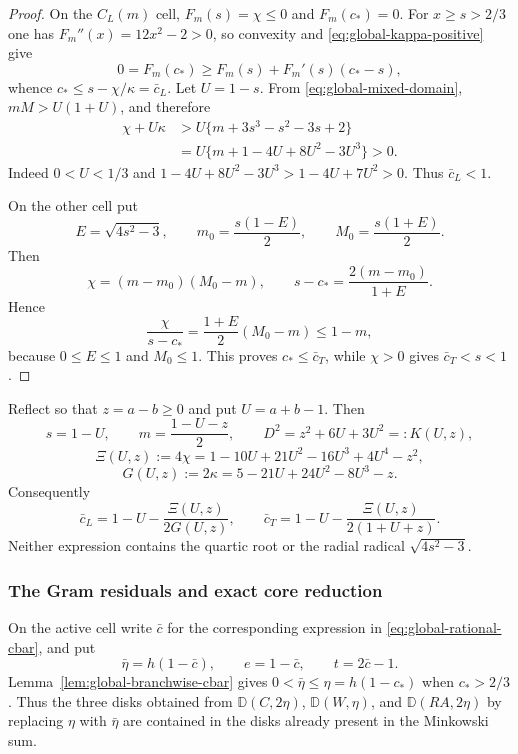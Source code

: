 \begin{proof}
On the $C_L(m)$ cell, $F_m(s)=\chi\le0$ and $F_m(c_*)=0$.  For
$x\ge s>2/3$ one has $F_m''(x)=12x^2-2>0$, so convexity and
\eqref{eq:global-kappa-positive} give
\[
 0=F_m(c_*)\ge F_m(s)+F_m'(s)(c_*-s),
\]
whence $c_*\le s-\chi/\kappa=\bar c_L$.  Let $U=1-s$.  From
\eqref{eq:global-mixed-domain}, $mM>U(1+U)$, and therefore
\[
 \begin{aligned}
 \chi+U\kappa
 &>U\{m+3s^3-s^2-3s+2\}\\
 &=U\{m+1-4U+8U^2-3U^3\}>0.
 \end{aligned}
\]
Indeed $0<U<1/3$ and
$1-4U+8U^2-3U^3>1-4U+7U^2>0$.  Thus $\bar c_L<1$.

On the other cell put
\[
 E=\sqrt{4s^2-3},\qquad
 m_0=\frac{s(1-E)}2,\qquad M_0=\frac{s(1+E)}2.
\]
Then
\[
 \chi=(m-m_0)(M_0-m),\qquad
 s-c_*=\frac{2(m-m_0)}{1+E}.
\]
Hence
\[
 \frac{\chi}{s-c_*}
 =\frac{1+E}{2}(M_0-m)\le1-m,
\]
because $0\le E\le1$ and $M_0\le1$.  This proves
$c_*\le\bar c_T$, while $\chi>0$ gives $\bar c_T<s<1$.
\end{proof}

Reflect so that $z=a-b\ge0$ and put $U=a+b-1$.  Then
\[
 s=1-U,\qquad m=\frac{1-U-z}{2},\qquad
 D^2=z^2+6U+3U^2=:K(U,z),
\]
\[
 \Xi(U,z):=4\chi
 =1-10U+21U^2-16U^3+4U^4-z^2,
\]
\[
 G(U,z):=2\kappa=5-21U+24U^2-8U^3-z.
\]
Consequently
\begin{equation}
 \bar c_L=1-U-\frac{\Xi(U,z)}{2G(U,z)},
 \qquad
 \bar c_T=1-U-\frac{\Xi(U,z)}{2(1+U+z)}.
 \label{eq:global-rational-cbar}
\end{equation}
Neither expression contains the quartic root or the radial radical
$\sqrt{4s^2-3}$.

\subsubsection{The Gram residuals and exact core reduction}

On the active cell write $\bar c$ for the corresponding expression in
\eqref{eq:global-rational-cbar}, and put
\[
 \bar\eta=h(1-\bar c),\qquad e=1-\bar c,
 \qquad t=2\bar c-1.
\]
Lemma~\ref{lem:global-branchwise-cbar} gives
$0<\bar\eta\le\eta=h(1-c_*)$ when $c_*>2/3$.  Thus the three disks obtained
from $\mathbb D(C,2\eta)$, $\mathbb D(W,\eta)$, and
$\mathbb D(RA,2\eta)$ by replacing $\eta$ with $\bar\eta$ are contained in
the disks already present in the Minkowski sum.

